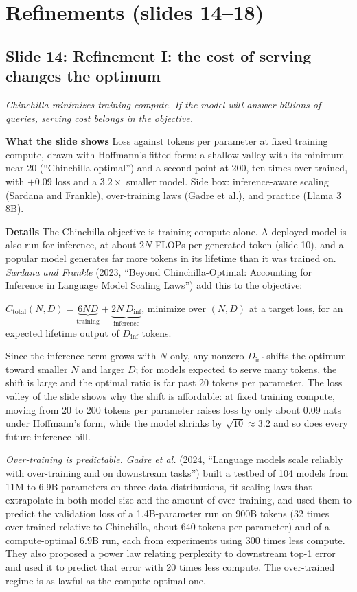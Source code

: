 \documentclass[11pt,letterpaper]{article}
\newcommand{\setstage}[1]{\colorlet{stagec}{#1}}
\newcommand{\slide}[3]{%
  \subsection[Slide #1: #2]{Slide #1: #2}%
  {\color{muted}\itshape #3\par}\medskip}
\newcommand{\para}[1]{\medskip\noindent\textbf{#1}\quad}
\newenvironment{formulas}{\begin{tcolorbox}[formulabox]}{\end{tcolorbox}}
\begin{document}
\setstage{posc}
\section{Refinements (slides 14--18)}

\slide{14}{Refinement I: the cost of serving changes the optimum}{Chinchilla minimizes training compute. If the model will answer billions of queries, serving cost belongs in the objective.}

\para{What the slide shows} Loss against tokens per parameter at fixed training compute, drawn with Hoffmann's fitted form: a shallow valley with its minimum near 20 (``Chinchilla-optimal'') and a second point at 200, ten times over-trained, with $+0.09$ loss and a $3.2\times$ smaller model. Side box: inference-aware scaling (Sardana and Frankle), over-training laws (Gadre et al.), and practice (Llama 3 8B).

\para{Details} The Chinchilla objective is training compute alone. A deployed model is also run for inference, at about $2N$ FLOPs per generated token (slide 10), and a popular model generates far more tokens in its lifetime than it was trained on. \emph{Sardana and Frankle} (2023, ``Beyond Chinchilla-Optimal: Accounting for Inference in Language Model Scaling Laws'') add this to the objective:
\begin{formulas}
$C_{\text{total}}(N,D)=\underbrace{6ND}_{\text{training}}+\underbrace{2N\,D_{\text{inf}}}_{\text{inference}}$, \qquad minimize over $(N,D)$ at a target loss, for an expected lifetime output of $D_{\text{inf}}$ tokens.
\end{formulas}
Since the inference term grows with $N$ only, any nonzero $D_{\text{inf}}$ shifts the optimum toward smaller $N$ and larger $D$; for models expected to serve many tokens, the shift is large and the optimal ratio is far past 20 tokens per parameter. The loss valley of the slide shows why the shift is affordable: at fixed training compute, moving from 20 to 200 tokens per parameter raises loss by only about 0.09 nats under Hoffmann's form, while the model shrinks by $\sqrt{10}\approx3.2$ and so does every future inference bill.

\emph{Over-training is predictable.} \emph{Gadre et al.} (2024, ``Language models scale reliably with over-training and on downstream tasks'') built a testbed of 104 models from 11M to 6.9B parameters on three data distributions, fit scaling laws that extrapolate in both model size and the amount of over-training, and used them to predict the validation loss of a 1.4B-parameter run on 900B tokens (32 times over-trained relative to Chinchilla, about 640 tokens per parameter) and of a compute-optimal 6.9B run, each from experiments using 300 times less compute. They also proposed a power law relating perplexity to downstream top-1 error and used it to predict that error with 20 times less compute. The over-trained regime is as lawful as the compute-optimal one.
\end{document}
